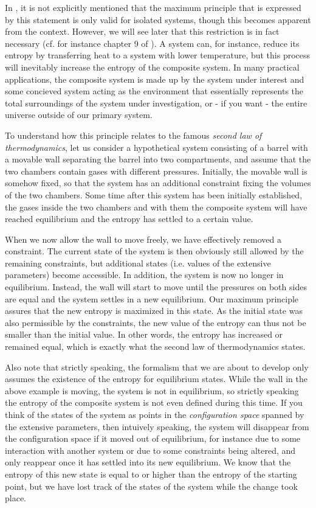 \documentclass[a4paper, draft]{report}
\numberwithin{section}{chapter}
\numberwithin{equation}{chapter}
\theoremstyle{own}
\theoremstyle{remark}
\begin{document}
In \cite{Callen}, it is not explicitly mentioned that the maximum principle that is expressed by this statement is only valid for isolated systems, though this becomes apparent from the context. However, we will see later that this restriction is in fact necessary (cf. for instance chapter 9 of \cite{Sweden}). A system can, for instance, reduce its entropy by transferring heat to a system with lower temperature, but this process will inevitably increase the entropy of the composite system. In many practical applications, the composite system is made up by the system under interest and some concieved system acting as the environment that essentially represents the total surroundings of the system under investigation, or - if you want - the entire universe outside of our primary system.

To understand how this principle relates to the famous {\em second law of thermodynamics}, let us consider a hypothetical system consisting of a barrel with a movable wall separating the barrel into two compartments, and assume that the two chambers contain gases with different pressures. Initially, the movable wall is somehow fixed, so that the system has an additional constraint fixing the volumes of the two chambers. Some time after this system has been initially established, the gases inside the two chambers and with them the composite system will have reached equilibrium and the entropy has settled to a certain value. 

When we now allow the wall to move freely, we have effectively removed a constraint. The current state of the system is then obviously still allowed by the remaining constraints, but additional states (i.e. values of the extensive parameters) become accessible. In addition, the system is now no longer in equilibrium. Instead, the wall will start to move until the pressures on both sides are equal and the system settles in a new equilibrium. Our maximum principle assures that the new entropy is maximized in this state. As the initial state was also permissible by the constraints, the new value of the entropy can thus not be smaller than the initial value. In other words, the entropy has increased or remained equal, which is exactly what the second law of thermodynamics states. 

Also note that strictly speaking, the formalism that we are about to develop only assumes the existence of the entropy for equilibrium states. While the wall in the above example is moving, the system is not in equilibrium, so strictly speaking the entropy of the composite system is not even defined during this time. If you think of the states of the system as points in the {\em configuration space} spanned by the extensive parameters, then intuively speaking, the system will disappear from the configuration space if it moved out of equilibrium, for instance due to some interaction with another system or due to some constraints being altered, and only reappear once it has settled into its new equilibrium. We know that the entropy of this new state is equal to or higher than the entropy of the starting point, but we have lost track of the states of the system while the change took place.
\end{document}
